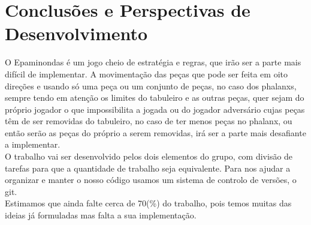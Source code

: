 \documentclass[a4paper]{article}
\begin{document}
\section{Conclusões e Perspectivas de Desenvolvimento}
O Epaminondas é um jogo cheio de estratégia e regras, que irão ser a parte mais difícil de implementar. A movimentação das peças que pode ser feita em oito direções e usando só uma peça ou um conjunto de peças, no caso dos phalanxs, sempre tendo em atenção os limites do tabuleiro e as outras peças, quer sejam do próprio jogador o que impossibilita a jogada ou do jogador adversário cujas peças têm de ser removidas do tabuleiro, no caso de ter menos peças no phalanx, ou então serão as peças do próprio a serem removidas, irá ser a parte mais desafiante a implementar.
\\\linebreak
O trabalho vai ser desenvolvido pelos dois elementos do grupo, com divisão de tarefas para que a quantidade de trabalho seja equivalente. Para nos ajudar a organizar e manter o nosso código usamos um sistema de controlo de versões, o git.
\\\linebreak
Estimamos que ainda falte cerca de 70(\%) do trabalho, pois temos muitas das ideias já formuladas mas falta a sua implementação.

\clearpage
{}
\renewcommand\refname{Bibliografia}


\end{document}
